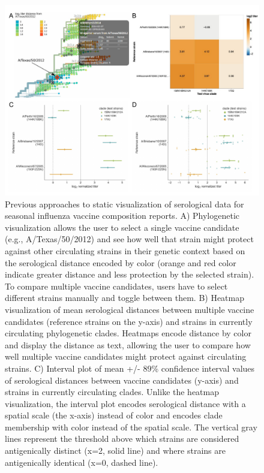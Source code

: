 \documentclass[utf8]{FrontiersinHarvard} %
\begin{document}
\begin{figure}[h!]
  \begin{center}
    \includegraphics[width=\textwidth]{figures/figure-1-mockup-static-visualizations-of-serological-data-for-decision-makers}
  \end{center}
  \caption{
    Previous approaches to static visualization of serological data for seasonal influenza vaccine composition reports.
A) Phylogenetic visualization \citep{NeherBedford2018} allows the user to select a single vaccine candidate (e.g., A/Texas/50/2012) and see how well that strain might protect against other circulating strains in their genetic context based on the serological distance encoded by color (orange and red color indicate greater distance and less protection by the selected strain).
To compare multiple vaccine candidates, users have to select different strains manually and toggle between them.
B) Heatmap visualization of mean serological distances between multiple vaccine candidates (reference strains on the y-axis) and strains in currently circulating phylogenetic clades.
Heatmaps encode distance by color and display the distance as text, allowing the user to compare how well multiple vaccine candidates might protect against circulating strains.
C) Interval plot of mean +/- 89\% confidence interval values of serological distances between vaccine candidates (y-axis) and strains in currently circulating clades.
Unlike the heatmap visualization, the interval plot encodes serological distance with a spatial scale (the x-axis) instead of color and encodes clade membership with color instead of the spatial scale.
The vertical gray lines represent the threshold above which strains are considered antigenically distinct (x=2, solid line) and where strains are antigenically identical (x=0, dashed line).
}
\end{figure}
\end{document}
